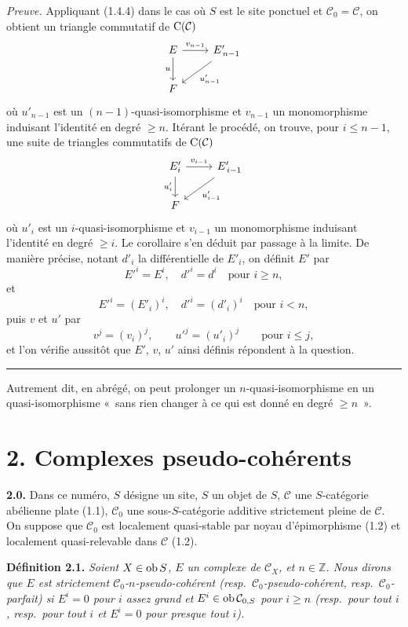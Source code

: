 \documentclass[11pt]{article}
\begin{document}
\emph{Preuve.} Appliquant (1.4.4) dans le cas où \(S\) est le site ponctuel et \(\mathcal C_0=\mathcal C\), on obtient un triangle commutatif de \(\mathrm C(\mathcal C)\)
\[
\begin{tikzcd}
E \arrow[r,"v_{n-1}"] \arrow[d,"u"'] & E'_{\,n-1} \arrow[dl,"u'_{n-1}"]\\
F &
\end{tikzcd}
\]
où \(u'_{n-1}\) est un \((n-1)\)-quasi-isomorphisme et \(v_{n-1}\) un monomorphisme induisant l'identité en degré \(\geq n\). Itérant le procédé, on trouve, pour \(i\leq n-1\), une suite de triangles commutatifs de \(\mathrm C(\mathcal C)\)
\[
\begin{tikzcd}
E'_i \arrow[r,"v_{i-1}"] \arrow[d,"u'_i"'] & E'_{\,i-1} \arrow[dl,"u'_{i-1}"]\\
F &
\end{tikzcd}
\]
où \(u'_i\) est un \(i\)-quasi-isomorphisme et \(v_{i-1}\) un monomorphisme induisant l'identité en degré \(\geq i\). Le corollaire s'en déduit par passage à la limite. De manière précise, notant \(d'_i\) la différentielle de \(E'_i\), on définit \(E'\) par
\[
  E'^i=E^i,\quad d'^i=d^i\quad\text{pour }i\geq n,
\]
et
\[
  E'^i=(E'_i)^i,\quad d'^i=(d'_i)^i\quad\text{pour }i<n,
\]
puis \(v\) et \(u'\) par
\[
  v^j=(v_i)^j,\qquad u'^j=(u'_i)^j\qquad\text{pour }i\leq j,
\]
et l'on vérifie aussitôt que \(E'\), \(v\), \(u'\) ainsi définis répondent à la question.



\medskip\hrule\medskip

Autrement dit, en abrégé, on peut prolonger un \(n\)-quasi-isomorphisme en un quasi-isomorphisme «~sans rien changer à ce qui est donné en degré \(\geq n\)~».

\section*{2. Complexes pseudo-cohérents}

\textbf{2.0.} Dans ce numéro, \(S\) désigne un site, \(S\) un objet de \(S\), \(\mathcal C\) une \(S\)-catégorie abélienne plate (1.1), \(\mathcal C_0\) une sous-\(S\)-catégorie additive strictement pleine de \(\mathcal C\). On suppose que \(\mathcal C_0\) est localement quasi-stable par noyau d'épimorphisme (1.2) et localement quasi-relevable dans \(\mathcal C\) (1.2).

\textbf{Définition 2.1.} \emph{Soient \(X\in\operatorname{ob} S\), \(E\) un complexe de \(\mathcal C_X\), et \(n\in\mathbb Z\). Nous dirons que \(E\) est strictement \(\mathcal C_0\)-\(n\)-pseudo-cohérent (resp.\ \(\mathcal C_0\)-pseudo-cohérent, resp.\ \(\mathcal C_0\)-parfait) si \(E^i=0\) pour \(i\) assez grand et \(E^i\in\operatorname{ob}\mathcal C_{0,S}\) pour \(i\geq n\) (resp.\ pour tout \(i\), resp.\ pour tout \(i\) et \(E^i=0\) pour presque tout \(i\)).}
\end{document}
